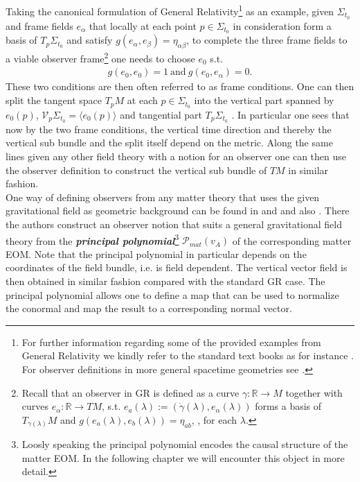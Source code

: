 \documentclass[a4paper,12pt, DIV=14, BCOR=5mm, twoside, headsepline]{scrbook}
\begin{document}
Taking the canonical formulation of General Relativity\footnote{For further information regarding some of the provided examples from General Relativity we kindly refer to the standard text books as for instance \cite{Misner1973}. For observer definitions in more general spacetime geometries see \cite{2011PhRvD..83d4047R}.} as an example, given $\Sigma_{t_0}$ and frame fields $e_{\alpha}$ that locally at each point $p \in \Sigma_{t_0}$ in consideration form a basis of $T_p\Sigma_{t_0}$ and satisfy $g(e_{\alpha},e_{\beta}) = \eta_{\alpha \beta}$, to complete the three frame fields to a viable observer frame\footnote{Recall that an observer in GR is defined as a curve $\gamma : \mathbb{R} \rightarrow M$ together with curves $e_{\alpha} : \mathbb{R} \rightarrow TM$, s.t. $ e_a(\lambda) :=(\dot{\gamma}(\lambda),e_{\alpha}(\lambda))$ forms a basis of $T_{\gamma(\lambda)}M$ and $g(e_a(\lambda),e_b(\lambda)) = \eta_{ab}$, , for each $\lambda$.} one needs to choose $e_0$ s.t. 
\begin{align}
    g(e_0,e_0) = 1 \ \text{and} \ g(e_0,e_{\alpha}) = 0.
\end{align}
These two conditions are then often referred to as frame conditions. One can then split the tangent space $T_pM$ at each $p \in \Sigma_{t_0}$ into the vertical part spanned by $e_0(p)$,  $\mathcal{V}_p\Sigma_{t_0} = \langle  e_0(p) \rangle$ and tangential part $T_p\Sigma_{t_0}$ . In particular one sees that now by the two frame conditions, the vertical time direction and thereby the vertical sub bundle and the split itself depend on the metric. Along the same lines given any other field theory with a notion for an observer one can then use the observer definition to construct the vertical sub bundle of $TM$ in similar fashion. \\

One way of defining observers from any matter theory that uses the given gravitational field as geometric background can be found in \cite{2018PhRvD..97h4036D} and \cite{2011PhRvD..83d4047R} and also \cite{Rivera}. There the authors construct an observer notion that suits a general gravitational field theory from the \textbf{\textit{principal polynomial}}\footnote{Loosly speaking the principal polynomial encodes the causal structure of the matter EOM. In the following chapter we will encounter this object in more detail.} $\mathcal{P}_{mat}(v_A)$ of the corresponding matter EOM. Note that the principal polynomial in particular depends on the coordinates of the field bundle, i.e. is field dependent. The vertical vector field is then obtained in similar fashion compared with the standard GR case. The principal polynomial allows one to define a map that can be used to normalize the conormal and map the result to a corresponding normal vector.
\end{document}
